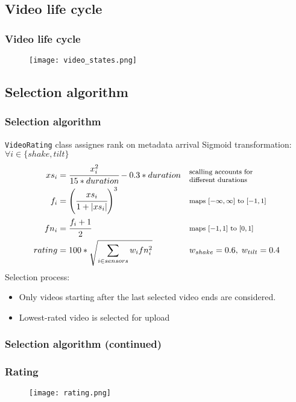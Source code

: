\subsection{Video life cycle}
\begin{frame}[fragile]	
	\frametitle{Video life cycle}
	\begin{figure}[!t]
		\centering
		\texttt{[image: video\_states.png]}
		\label{fig:states}
	\end{figure}
\end{frame}

\subsection{Selection algorithm}
\begin{frame}	
	\frametitle{Selection algorithm}
	\texttt{VideoRating} class assignes rank on metadata arrival
	Sigmoid transformation: $\forall i \in \{shake, tilt\}$
	\begin{align*}
		xs_i &= \cfrac{x_i^2}{15 * duration} - 0.3 * duration 
			&&\parbox{10em}{\footnotesize scalling accounts for \\ different durations}\\
		f_i  &= \left(\cfrac{xs_i}{1+|xs_i|}\right)^3
			&& \parbox{10em}{\footnotesize maps $[-\infty,\infty]$ to $[-1, 1]$}\\
		fn_i &= \cfrac{f_i + 1}{2}
			&& \parbox{10em}{\footnotesize maps $[-1,1]$ to $[0,1]$}\\
		rating &= 100 * \sqrt{ \sum\limits_{i \in sensors}{w_i fn_i^2} } 
			&&w_{shake} = 0.6,\; w_{tilt} = 0.4
		\end{align*}
	Selection process:
	\begin{itemize}
		\item Only videos starting after the last selected video ends are considered.
		\item Lowest-rated video is selected for upload
	\end{itemize}
\end{frame}

\begin{frame}	
	\frametitle{Selection algorithm (continued)}
	\begin{figure}[!t]
		\centering
		\hfill
	\end{figure}
\end{frame}

\begin{frame}	
	\frametitle{Rating}
	\begin{figure}[!t]
		\centering
		\texttt{[image: rating.png]}
		\label{fig:rating}
	\end{figure}
\end{frame}